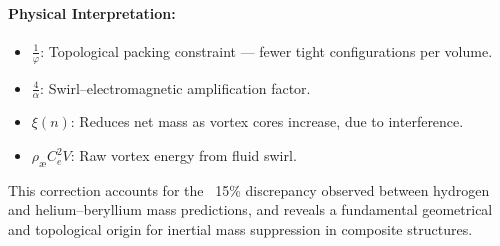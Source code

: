 \documentclass[12pt]{article}
\begin{document}
\paragraph{Physical Interpretation:}
\begin{itemize}
  \item \( \frac{1}{\varphi} \): Topological packing constraint — fewer tight configurations per volume.
  \item \( \frac{4}{\alpha} \): Swirl–electromagnetic amplification factor.
  \item \( \xi(n) \): Reduces net mass as vortex cores increase, due to interference.
  \item \( \rho_\text{\ae} C_e^2 V \): Raw vortex energy from fluid swirl.
\end{itemize}

\noindent
This correction accounts for the ~15\% discrepancy observed between hydrogen and helium–beryllium mass predictions, and reveals a fundamental geometrical and topological origin for inertial mass suppression in composite structures.


\ifdefined\standalonechapter\else
    
    
    
\end{document}
